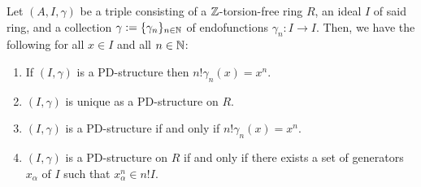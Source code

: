                 \begin{proposition}
                    Let $(A, I, \gamma)$ be a triple consisting of a $\mathbb{Z}$-torsion-free ring $R$, an ideal $I$ of said ring, and a collection $\gamma := \{\gamma_n\}_{n \in \mathbb{N}}$ of endofunctions $\gamma_n: I \to I$. Then, we have the following for all $x \in I$ and all $n \in \mathbb{N}$:
                        \begin{enumerate}
                            \item If $(I, \gamma)$ is a PD-structure then $n! \gamma_n(x) = x^n$.
                            \item $(I, \gamma)$ is unique as a PD-structure on $R$.
                            \item $(I, \gamma)$ is a PD-structure if and only if $n! \gamma_n(x) = x^n$. 
                            \item $(I, \gamma)$ is a PD-structure on $R$ if and only if there exists a set of generators $x_{\alpha}$ of $I$ such that $x_{\alpha}^n \in n! I$. 
                        \end{enumerate}
                \end{proposition}

